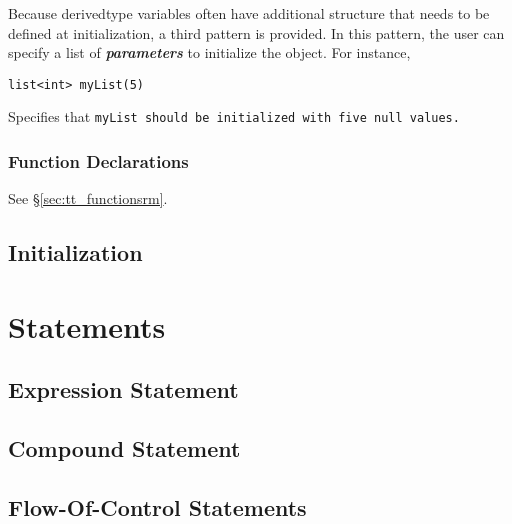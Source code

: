 \documentclass{book}
\begin{document}
Because derived­type variables often have additional structure that needs to be
defined at initialization, a third pattern is provided. In this pattern, the user
can specify a list of \textbf{\emph{parameters}} to initialize the object. For
instance,

\begin{verbatim}
list<int> myList(5)
\end{verbatim}

Specifies that \tt myList \rm should be initialized with five \tt null \rm values.


\subsection{Function Declarations} %
\label{sub:function_declarations}

See \S \ref{sec:tt_functionsrm}.



\section{Initialization} %
\label{sec:initialization}



\chapter{Statements} %
\label{cha:statements}

\section{Expression Statement} %
\label{sec:expression_statement}


\section{Compound Statement} %
\label{sec:compound_statement}


\section{Flow-Of-Control Statements} %
\label{sec:flow_of_control_statements}
\end{document}
